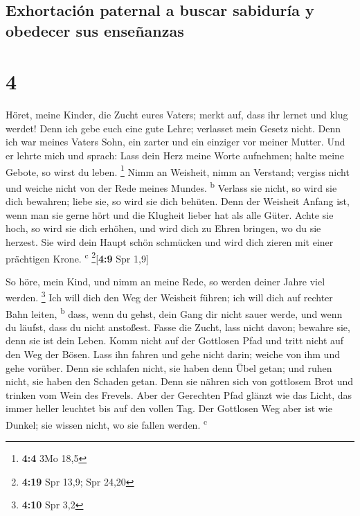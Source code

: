 \hypertarget{exhortaciuxf3n-paternal-a-buscar-sabiduruxeda-y-obedecer-sus-enseuxf1anzas}{%
\subsection{Exhortación paternal a buscar sabiduría y obedecer sus
enseñanzas}\label{exhortaciuxf3n-paternal-a-buscar-sabiduruxeda-y-obedecer-sus-enseuxf1anzas}}

\hypertarget{section-3}{%
\section{4}\label{section-3}}

 Höret, meine Kinder, die Zucht eures Vaters; merkt auf,
dass ihr lernet und klug werdet!  Denn ich gebe euch eine
gute Lehre; verlasset mein Gesetz nicht.  Denn ich war
meines Vaters Sohn, ein zarter und ein einziger vor meiner Mutter.
 Und er lehrte mich und sprach: Lass dein Herz meine Worte
aufnehmen; halte meine Gebote, so wirst du leben. \footnote{\textbf{4:4}
  3Mo 18,5}  Nimm an Weisheit, nimm an Verstand; vergiss
nicht und weiche nicht von der Rede meines Mundes. \textsuperscript{b}
 Verlass sie nicht, so wird sie dich bewahren; liebe sie,
so wird sie dich behüten.  Denn der Weisheit Anfang ist,
wenn man sie gerne hört und die Klugheit lieber hat als alle Güter.
 Achte sie hoch, so wird sie dich erhöhen, und wird dich
zu Ehren bringen, wo du sie herzest.  Sie wird dein Haupt
schön schmücken und wird dich zieren mit einer prächtigen Krone.
\textsuperscript{c} \footnote{\textbf{4:19} Spr 13,9; Spr 24,20}{[}\textbf{4:9}
Spr 1,9{]}

 So höre, mein Kind, und nimm an meine Rede, so werden
deiner Jahre viel werden. \footnote{\textbf{4:10} Spr 3,2}
 Ich will dich den Weg der Weisheit führen; ich will dich
auf rechter Bahn leiten, \textsuperscript{b}  dass, wenn
du gehst, dein Gang dir nicht sauer werde, und wenn du läufst, dass du
nicht anstoßest.  Fasse die Zucht, lass nicht davon;
bewahre sie, denn sie ist dein Leben.  Komm nicht auf der
Gottlosen Pfad und tritt nicht auf den Weg der Bösen. 
Lass ihn fahren und gehe nicht darin; weiche von ihm und gehe vorüber.
 Denn sie schlafen nicht, sie haben denn Übel getan; und
ruhen nicht, sie haben den Schaden getan.  Denn sie
nähren sich von gottlosem Brot und trinken vom Wein des Frevels.
 Aber der Gerechten Pfad glänzt wie das Licht, das immer
heller leuchtet bis auf den vollen Tag.  Der Gottlosen
Weg aber ist wie Dunkel; sie wissen nicht, wo sie fallen werden.
\textsuperscript{c}

